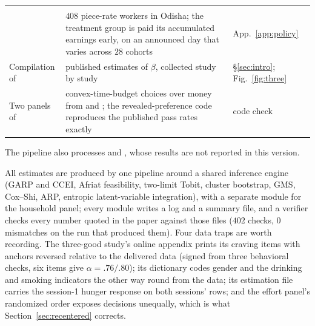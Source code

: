 \documentclass[11pt,a4paper]{article}
\theoremstyle{plain}
\theoremstyle{definition}
\begin{document}
\begin{table}[H]
{\begin{tabular}{@{}>{\raggedright\arraybackslash}p{3.3cm}>{\raggedright\arraybackslash}p{10.25cm}>{\raggedright\arraybackslash}p{2.05cm}@{}}
\addlinespace[4pt]
\multicolumn{3}{@{}l@{}}{\textit{Policy, background and code checks}} \\
\citet{kaur2025} & $408$ piece-rate workers in Odisha; the treatment group is paid its accumulated earnings early, on an announced day that varies across $28$ cohorts & App.~\ref{app:policy} \\
Compilation of \citet{lockwood2020} & published estimates of $\beta$, collected study by study & \S\ref{sec:intro}; Fig.~\ref{fig:three} \\
Two panels of \citet{eis2020} & convex-time-budget choices over money from \citet{andreoni2012a} and \citet{carvalho2016}; the revealed-preference code reproduces the published pass rates exactly & code check \\
\bottomrule
\end{tabular}}

\smallskip
{\scriptsize\raggedright The pipeline also processes \citet{andreoni2012b} and \citet{dertwinkel2021}, whose results are not reported in this version.\par}
\end{table}

\noindent All estimates are produced by one pipeline around a shared inference engine (GARP and CCEI, Afriat
feasibility, two-limit Tobit, cluster bootstrap, GMS, Cox--Shi, ARP, entropic latent-variable integration), with a
separate module for the household panel; every module writes a log and a summary file, and a verifier checks every
number quoted in the paper against those files ($402$ checks, $0$ mismatches on the run that produced them). Four data
traps are worth recording. The three-good study's online appendix prints its craving items with anchors reversed
relative to the delivered data (signed from three behavioral checks, six items give $\alpha=.76/.80$); its dictionary
codes gender and the drinking and smoking indicators the other way round from the data; its estimation file carries
the session-1 hunger response on both sessions' rows; and the effort panel's randomized order exposes decisions
unequally, which is what Section~\ref{sec:recentered} corrects.
\end{document}
